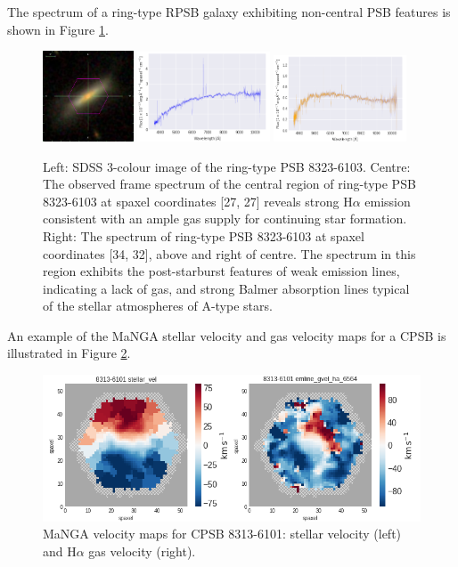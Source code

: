 The spectrum of a ring-type RPSB galaxy exhibiting non-central PSB features is shown in Figure \ref{fig:RPSB-8323-6103-spec}.
\begin{figure}
    \centering
    \includegraphics[width=0.24\textwidth]{images/Cutouts/RPSB-8323-6103-IM.png}
    \hfill
    \includegraphics[width=0.35\textwidth]{images/Spectra/RPSB-8323-6103-27-27.png}
    \hfill
    \includegraphics[width=0.35\textwidth]{images/Spectra/RPSB-8323-6103-34-32.png}
    \caption{Left: SDSS 3-colour image of the ring-type PSB 8323-6103. 
    Centre: The observed frame spectrum of the central region of ring-type PSB 8323-6103 at spaxel coordinates [27, 27] reveals strong H$\alpha$ emission consistent with an ample gas supply for continuing star formation.
    Right: The spectrum of ring-type PSB 8323-6103 at spaxel coordinates [34, 32], above and right of centre. The spectrum in this region exhibits the post-starburst features of weak emission lines, indicating a lack of gas, and strong Balmer absorption lines typical of the stellar atmospheres of A-type stars.}
    \label{fig:RPSB-8323-6103-spec}
\end{figure}

An example of the MaNGA stellar velocity and gas velocity maps for a CPSB is illustrated in Figure \ref{fig:CPSB-8313-6101-VMAPS}.

\begin{figure}
    \centering
\includegraphics[width=\columnwidth]{images/VelocityMaps/CPSB-8313-6101-VMAPS.png}
    \caption{MaNGA velocity maps for CPSB 8313-6101: stellar velocity (left) and H$\alpha$ gas velocity (right).}
    \label{fig:CPSB-8313-6101-VMAPS}
\end{figure}


